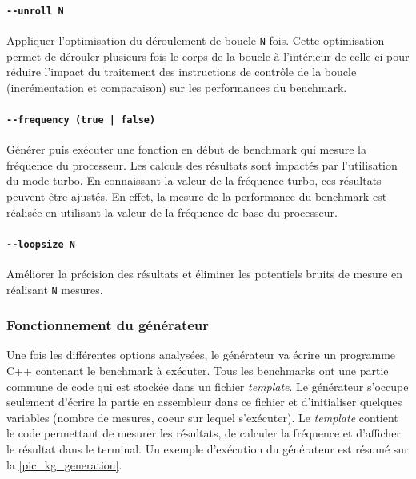         \paragraph{\texttt{-{}-unroll N}} Appliquer l'optimisation du déroulement de boucle \texttt{N} fois. Cette optimisation permet de dérouler plusieurs fois le corps de la boucle à l'intérieur de celle-ci pour réduire l'impact du traitement des instructions de contrôle de la boucle (incrémentation et comparaison) sur les performances du benchmark. 
        
        \paragraph{\texttt{-{}-frequency (true | false)}} Générer puis exécuter une fonction en début de benchmark qui mesure la fréquence du processeur. Les calculs des résultats sont impactés par l'utilisation du mode turbo. En connaissant la valeur de la fréquence turbo, ces résultats peuvent être ajustés. En effet, la mesure de la performance du benchmark est réalisée en utilisant la valeur de la fréquence de base du processeur. 
        
        \paragraph{\texttt{-{}-loopsize N}} Améliorer la précision des résultats et éliminer les potentiels bruits de mesure en réalisant \texttt{N} mesures.
    
    
    \subsubsection{Fonctionnement du générateur}
        
        Une fois les différentes options analysées, le générateur va écrire un programme C++ contenant le benchmark à exécuter. Tous les benchmarks ont une partie commune de code qui est stockée dans un fichier \textit{template}. Le générateur s'occupe seulement d'écrire la partie en assembleur dans ce fichier et d'initialiser quelques variables (nombre de mesures, coeur sur lequel s'exécuter). Le \textit{template} contient le code permettant de mesurer les résultats, de calculer la fréquence et d'afficher le résultat  dans le terminal. Un exemple d'exécution du générateur est résumé sur la \autoref{pic_kg_generation}. 

